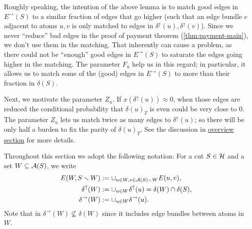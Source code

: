 Roughly speaking, the intention of the above lemma is to match good edges in $E^\rightarrow(S)$ to a similar fraction of edges that go higher (such that an edge bundle $e$ adjacent to atoms $u,v$ is only matched to edges in $\delta^\uparrow(u),\delta^\uparrow(v)$). Since we never ``reduce'' bad edges in the proof of payment theorem (\cref{thm:payment-main}), we don't use them in the matching. That inherently can cause a problem, as there could not be ``enough'' good edges in $E^\rightarrow(S)$ to saturate the edges going higher in the matching. The parameter $F_u$ help us in this regard; in particular, it allows us to match some of the (good) edges in $E^\rightarrow(S)$ to more than their fraction in $\delta(S)$.
 
Next, we motivate the parameter $Z_u$. If  $x(\delta^\uparrow(u))\approx 0$, when those edges are reduced the conditional probability that $\delta(u)_T$ is even could be very close to 0. 
The parameter $Z_u$ lets us match twice as many edges to $\delta^\uparrow(u)$; so there will be only half a burden to fix the parity of $\delta(u)_T$.
See the discussion in \hyperlink{xu-close-to-zero}{overview section} for more details. 



Throughout this section we adopt the following notation: For a cut $S\in \mathcal{H}$ and a set $W\subseteq {\cal A}(S)$, we write 
\begin{align*}
E(W,S\smallsetminus W)&:=\cup_{u\in W, v\in {\cal A}(S)\smallsetminus W} E(u,v),\\
\delta^\uparrow(W)&:=\cup_{u\in W} \delta^\uparrow(u)=\delta(W)\cap \delta(S), \\
\delta^\rightarrow(W) &:= \cup_{u\in W} \delta^\rightarrow(u).
\end{align*}
Note that in $\delta^\rightarrow(W)\not\subseteq \delta(W)$ since it includes edge bundles between atoms in $W$. 

